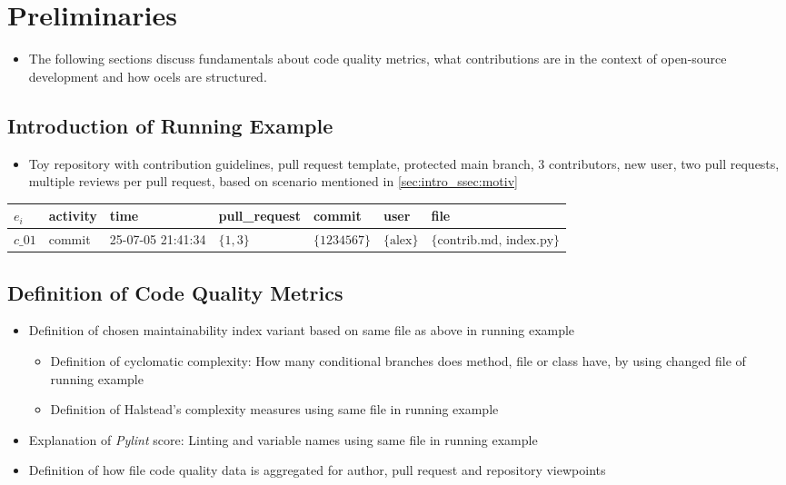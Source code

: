 \chapter{Preliminaries}
\label{chap:prelim}
\begin{itemize}
	\item The following sections discuss fundamentals about code quality metrics, what contributions are in the context of open-source development and how \acp{ocel} are structured.
\end{itemize}

\section{Introduction of Running Example}
\begin{itemize}
	\item Toy repository with contribution guidelines, pull request template, protected main branch, 3 contributors, new user, two pull requests, multiple reviews per pull request, based on scenario mentioned in \autoref{sec:intro_ssec:motiv}
\end{itemize}

\begin{tabular}{|l|l|l|l|l|l|l|}
\hline
$e_i$ & activity & time & pull\_request & commit & user & file \\
\hline
$c\_01$ & commit & 25-07-05 21:41:34 & $\{1,3\}$ & $\{1234567\}$ & $\{\text{alex}\}$ & $\{\text{contrib.md, index.py}\}$ \\ 
\hline
\end{tabular}



\section{Definition of Code Quality Metrics}
\begin{itemize}
	\item Definition of chosen maintainability index variant based on same file as above in running example
	\begin{itemize}
		\item Definition of cyclomatic complexity: How many conditional branches does method, file or class have, by using changed file of running example
		\item Definition of Halstead's complexity measures using same file in running example
	\end{itemize}
	\item Explanation of \emph{Pylint} score: Linting and variable names using same file in running example
	\item Definition of how file code quality data is aggregated for author, pull request and repository viewpoints
\end{itemize}

